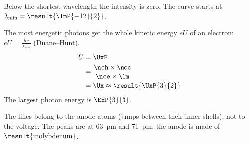 \begin{abcliste}
\abc Below the shortest wavelength the intensity is zero. The curve starts at $\lambda_\text{min} = \result{\lmP{-12}{2}}$.

\abc The most energetic photons get the whole kinetic energy $eU$ of an electron: $e U = \frac{h c}{\lambda_\text{min}}$ (Duane--Hunt).
\begin{align}
 U &= \UxF \\
   &= \frac{\nch\times\ncc}{\nce\times\lm} \\
   &= \Ux \approx \result{\UxP{3}{2}}
\end{align}
The largest photon energy is $\ExP{3}{3}$.

\abc The lines belong to the anode atoms (jumps between their inner shells), not to the voltage. The peaks are at \SI{63}{\pico\m} and \SI{71}{\pico\m}: the anode is made of $\result{\text{molybdenum}}$.
\end{abcliste}
